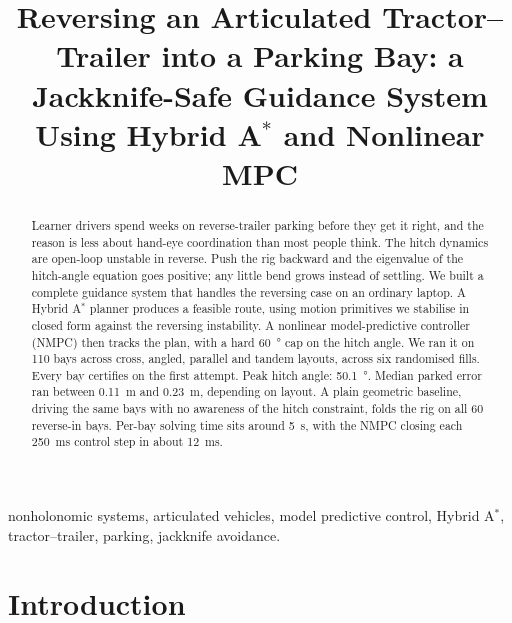 \documentclass[conference]{IEEEtran}
\begin{document}
\title{Reversing an Articulated Tractor--Trailer into a Parking Bay: a Jackknife-Safe Guidance System Using Hybrid A$^{*}$ and Nonlinear MPC\\
}

\author{
}

\maketitle

\begin{abstract}
Learner drivers spend weeks on reverse-trailer parking before they get it
right, and the reason is less about hand-eye coordination than most people
think. The hitch dynamics are open-loop unstable in reverse. Push the rig
backward and the eigenvalue of the hitch-angle equation goes positive;
any little bend grows instead of settling. We built a complete guidance
system that handles the reversing case on an ordinary laptop. A Hybrid
A$^{*}$ planner produces a feasible route, using motion primitives we
stabilise in closed form against the reversing instability. A nonlinear
model-predictive controller (NMPC) then tracks the plan, with a hard
\SI{60}{\degree} cap on the hitch angle. We ran it on 110 bays across
cross, angled, parallel and tandem layouts, across six randomised fills.
Every bay certifies on the first attempt. Peak hitch angle:
\SI{50.1}{\degree}. Median parked error ran between \SI{0.11}{\meter} and
\SI{0.23}{\meter}, depending on layout. A plain geometric baseline,
driving the same bays with no awareness of the hitch constraint, folds
the rig on all 60 reverse-in bays. Per-bay solving time sits around
\SI{5}{\second}, with the NMPC closing each \SI{250}{\milli\second}
control step in about \SI{12}{\milli\second}.
\end{abstract}

\begin{IEEEkeywords}
nonholonomic systems, articulated vehicles, model predictive control,
Hybrid A$^{*}$, tractor--trailer, parking, jackknife avoidance.
\end{IEEEkeywords}

\section{Introduction}
\end{document}
